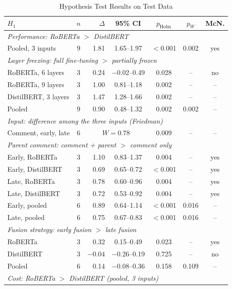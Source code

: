 \documentclass[conference]{IEEEtran}
\begin{document}
\begin{table}[t]
\caption{Hypothesis Test Results on Test Data}
\label{tab:uji}
\centering
\footnotesize
\setlength{\tabcolsep}{2.2pt}
\begin{tabular}{lcrcccc}
\hline
$H_1$ & $n$ & $\Delta$ & 95\% CI & $p_{\mathrm{Holm}}$ & $p_W$ & McN. \\
\hline
\multicolumn{7}{l}{\textit{Performance: RoBERTa $>$ DistilBERT}} \\
Pooled, 3 inputs & 9 & 1.81 & 1.65--1.97 & $<$0.001 & 0.002 & yes \\
\hline
\multicolumn{7}{l}{\textit{Layer freezing: full fine-tuning $>$ partially frozen}} \\
RoBERTa, 6 layers & 3 & 0.24 & $-$0.02--0.49 & 0.028 & -- & no \\
RoBERTa, 9 layers & 3 & 1.00 & 0.81--1.18 & 0.002 & -- & -- \\
DistilBERT, 3 layers & 3 & 1.47 & 1.28--1.66 & 0.002 & -- & -- \\
Pooled & 9 & 0.90 & 0.48--1.32 & 0.002 & 0.002 & -- \\
\hline
\multicolumn{7}{l}{\textit{Input: difference among the three inputs (Friedman)}} \\
Comment, early, late & 6 & \multicolumn{2}{c}{$W = 0.78$} & 0.009 & -- & -- \\
\hline
\multicolumn{7}{l}{\textit{Parent comment: comment + parent $>$ comment only}} \\
Early, RoBERTa & 3 & 1.10 & 0.83--1.37 & 0.004 & -- & yes \\
Early, DistilBERT & 3 & 0.69 & 0.65--0.72 & $<$0.001 & -- & yes \\
Late, RoBERTa & 3 & 0.78 & 0.60--0.96 & 0.004 & -- & yes \\
Late, DistilBERT & 3 & 0.72 & 0.53--0.92 & 0.004 & -- & yes \\
Early, pooled & 6 & 0.89 & 0.64--1.14 & $<$0.001 & 0.016 & -- \\
Late, pooled & 6 & 0.75 & 0.67--0.83 & $<$0.001 & 0.016 & -- \\
\hline
\multicolumn{7}{l}{\textit{Fusion strategy: early fusion $>$ late fusion}} \\
RoBERTa & 3 & 0.32 & 0.15--0.49 & 0.023 & -- & yes \\
DistilBERT & 3 & $-$0.04 & $-$0.26--0.19 & 0.725 & -- & no \\
Pooled & 6 & 0.14 & $-$0.08--0.36 & 0.158 & 0.109 & -- \\
\hline
\multicolumn{7}{l}{\textit{Cost: RoBERTa $>$ DistilBERT (pooled, 3 inputs)}} \\

\end{tabular}
\end{table}
\end{document}

